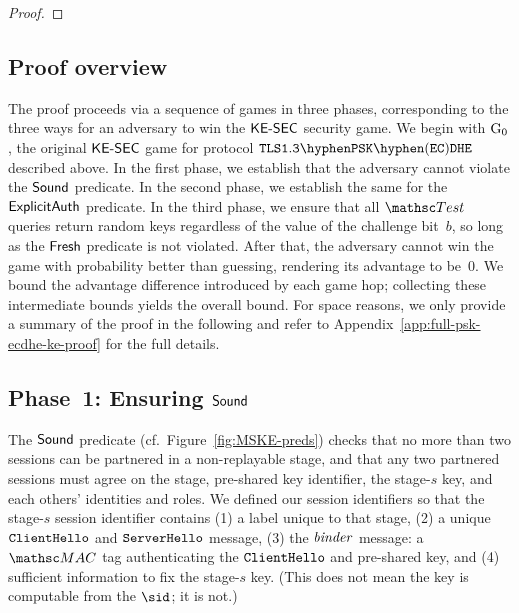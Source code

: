 \iffull
	\begin{proof}
	
	\end{proof}
\else
\subsection{Proof overview}
\label{sec:psk-ecdhe-ke-proof-overview}

The proof proceeds via a sequence of games in three phases, corresponding to the three ways for an adversary to win the $\mathsf{KE{\text{\normalfont-}}SEC}$ security game.
We begin with $\textnormal{G}_0$, the original $\mathsf{KE{\text{\normalfont-}}SEC}$ game for protocol $\TLSPSKECDHE$ described above. 
In the first phase, we establish that the adversary cannot violate the $\mathsf{Sound}$ predicate.
In the second phase, we establish the same for the $\mathsf{ExplicitAuth}$ predicate.
In the third phase, we ensure that all $\Test$ queries return random keys regardless of the value of the challenge bit~$b$, so long as the $\mathsf{Fresh}$ predicate is not violated.
After that, the adversary cannot win the game with probability better than guessing, rendering its advantage to be~$0$.
We bound the advantage difference introduced by each game hop; collecting these intermediate bounds yields the overall bound.
For space reasons, we only provide a summary of the proof in the following and refer to 
	Appendix~\ref{app:full-psk-ecdhe-ke-proof} 
for the full details.


\subsection*{Phase~1: Ensuring $\mathsf{Sound}$}
The $\mathsf{Sound}$ predicate 
	(cf.\ Figure~\ref{fig:MSKE-preds}) 
checks that no more than two sessions can be partnered in a non-replayable stage, and that any two partnered sessions must agree on the stage, pre-shared key identifier, the stage-$s$ key, and each others' identities and roles. 
We defined our session identifiers so that the stage-$s$ session identifier contains (1) a label unique to that stage,  (2) a unique $\mathtt{ClientHello}$ and $\mathtt{ServerHello}$ message, (3) the $\mathit{binder}$ message: a $\MAC$ tag authenticating the $\mathtt{ClientHello}$ and pre-shared key, and (4) sufficient information to fix the stage-$s$ key. 
(This does not mean the key is computable from the $\sid$; it is not.)

